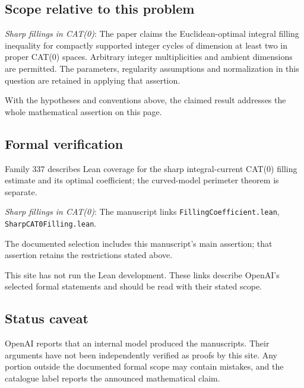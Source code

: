 \documentclass[11pt]{article}
\begin{document}
\subsection{Scope relative to this problem}
\textit{Sharp fillings in CAT(0)}: The paper claims the Euclidean-optimal integral filling inequality for compactly supported integer cycles of dimension at least two in proper CAT(0) spaces. Arbitrary integer multiplicities and ambient dimensions are permitted. The parameters, regularity assumptions and normalization in this question are retained in applying that assertion.

With the hypotheses and conventions above, the claimed result addresses the whole mathematical assertion on this page.

\subsection{Formal verification}
Family 337 describes Lean coverage for the sharp integral-current CAT(0) filling estimate and its optimal coefficient; the curved-model perimeter theorem is separate.

\textit{Sharp fillings in CAT(0)}: The manuscript links \texttt{FillingCoefficient.lean}, \texttt{SharpCAT0Filling.lean}.

The documented selection includes this manuscript’s main assertion; that assertion retains the restrictions stated above.

This site has not run the Lean development. These links describe OpenAI’s selected formal statements and should be read with their stated scope.

\subsection{Status caveat}
OpenAI reports that an internal model produced the manuscripts. Their arguments have not been independently verified as proofs by this site. Any portion outside the documented formal scope may contain mistakes, and the catalogue label reports the announced mathematical claim.
\end{document}
